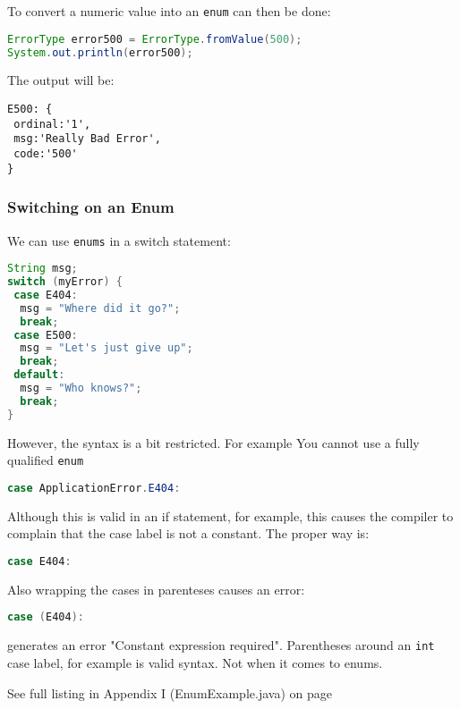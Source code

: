 To convert a numeric value into an \texttt{enum} can then be done:
\begin{lstlisting}[language=Java]
ErrorType error500 = ErrorType.fromValue(500);
System.out.println(error500);
\end{lstlisting}

The output will be:
\begin{lstlisting}
E500: {
 ordinal:'1',
 msg:'Really Bad Error',
 code:'500'
}
\end{lstlisting}

\subsubsection{Switching on an Enum}
We can use \texttt{enums} in a switch statement:
\begin{lstlisting}[language=Java]
String msg;
switch (myError) {
 case E404:
  msg = "Where did it go?";
  break;
 case E500:
  msg = "Let's just give up";
  break;
 default:
  msg = "Who knows?";
  break;
}
\end{lstlisting}
However, the syntax is a bit restricted. For example You cannot use a fully qualified \texttt{enum}
\begin{lstlisting}[language=Java]
case ApplicationError.E404:
\end{lstlisting}
Although this is valid in an if statement, for example, this causes the compiler to complain that the case label is not a constant. The proper way is:
\begin{lstlisting}[language=Java]
case E404:
\end{lstlisting}
Also wrapping the cases in parenteses causes an error:
\begin{lstlisting}[language=Java]
case (E404):
\end{lstlisting}
generates an error "Constant expression required". Parentheses around an \texttt{int} case label, for example is valid syntax. Not when it comes to enums.

See full listing in Appendix I (EnumExample.java) on page \pageref{App:AppendixIExample}